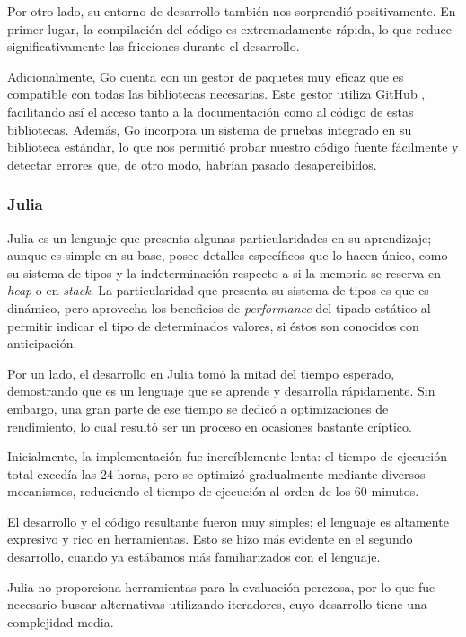 \documentclass[11pt]{article}
\let\Oldsubsubsection\subsubsection
\renewcommand{\subsubsection}{\FloatBarrier\Oldsubsubsection}
\newcommand{\english}[1]{\textit{#1}}
\begin{document}
Por otro lado, su entorno de desarrollo también nos sorprendió positivamente. En primer lugar, la compilación del código es extremadamente rápida, lo que reduce significativamente las fricciones durante el desarrollo.

Adicionalmente, Go cuenta con un gestor de paquetes muy eficaz que es compatible con todas las bibliotecas necesarias. Este gestor utiliza GitHub \cite{com:github}, facilitando así el acceso tanto a la documentación como al código de estas bibliotecas. Además, Go incorpora un sistema de pruebas integrado en su biblioteca estándar, lo que nos permitió probar nuestro código fuente fácilmente y detectar errores que, de otro modo, habrían pasado desapercibidos.

\subsubsection{Julia}

Julia es un lenguaje que presenta algunas particularidades en su aprendizaje; aunque es simple en su base, posee detalles específicos que lo hacen único, como su sistema de tipos y la indeterminación respecto a si la memoria se reserva en \english{heap} o en \english{stack}. La particularidad que presenta su sistema de tipos es que es dinámico, pero aprovecha los beneficios de \english{performance} del tipado estático al permitir indicar el tipo de determinados valores, si éstos son conocidos con anticipación.

Por un lado, el desarrollo en Julia tomó la mitad del tiempo esperado, demostrando que es un lenguaje que se aprende y desarrolla rápidamente. Sin embargo, una gran parte de ese tiempo se dedicó a optimizaciones de rendimiento, lo cual resultó ser un proceso en ocasiones bastante críptico.

Inicialmente, la implementación fue increíblemente lenta: el tiempo de ejecución total excedía las 24 horas, pero se optimizó gradualmente mediante diversos mecanismos, reduciendo el tiempo de ejecución al orden de los 60 minutos.

El desarrollo y el código resultante fueron muy simples; el lenguaje es altamente expresivo y rico en herramientas. Esto se hizo más evidente en el segundo desarrollo, cuando ya estábamos más familiarizados con el lenguaje.

Julia no proporciona herramientas para la evaluación perezosa, por lo que fue necesario buscar alternativas utilizando iteradores, cuyo desarrollo tiene una complejidad media.
\end{document}
